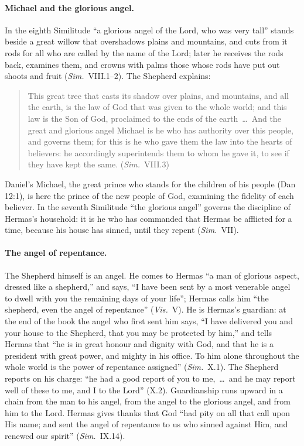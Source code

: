 \paragraph{Michael and the glorious angel.} In the eighth Similitude ``a
glorious angel of the Lord, who was very tall'' stands beside a great
willow that overshadows plains and mountains, and cuts from it rods for
all who are called by the name of the Lord; later he receives the rods
back, examines them, and crowns with palms those whose rods have put out shoots and fruit
(\emph{Sim.}\ VIII.1--2). The Shepherd explains:

\begin{quote}
This great tree that casts its shadow over plains, and mountains, and all
the earth, is the law of God that was given to the whole world; and this
law is the Son of God, proclaimed to the ends of the earth~\dots\ And the
great and glorious angel Michael is he who has authority over this
people, and governs them; for this is he who gave them the law into the
hearts of believers: he accordingly superintends them to whom he gave it,
to see if they have kept the same. (\emph{Sim.}\ VIII.3)
\end{quote}

\noindent Daniel's Michael, the great prince who stands for the children
of his people (Dan 12:1), is here the prince of the new people of God,
examining the fidelity of each believer. In the seventh Similitude ``the
glorious angel'' governs the discipline of Hermas's household: it is he
who has commanded that Hermas be afflicted for a time, because his house
has sinned, until they repent (\emph{Sim.}\ VII).

\paragraph{The angel of repentance.} The Shepherd himself is an angel. He
comes to Hermas ``a man of glorious aspect, dressed like a shepherd,''
and says, ``I have been sent by a most venerable angel to dwell with you
the remaining days of your life''; Hermas calls him ``the shepherd, even
the angel of repentance'' (\emph{Vis.}\ V). He is Hermas's guardian: at
the end of the book the angel who first sent him says, ``I have delivered
you and your house to the Shepherd, that you may be protected by him,''
and tells Hermas that ``he is in great honour and dignity with God, and
that he is a president with great power, and mighty in his office. To him
alone throughout the whole world is the power of repentance assigned''
(\emph{Sim.}\ X.1). The Shepherd reports on his charge: ``he had a good
report of you to me,~\dots\ and he may report well of these to me, and I
to the Lord'' (X.2). Guardianship runs upward in a chain from the man to
his angel, from the angel to the glorious angel, and from him to the Lord.
Hermas gives thanks that God ``had pity on all that call upon His name;
and sent the angel of repentance to us who sinned against Him, and
renewed our spirit'' (\emph{Sim.}\ IX.14).

